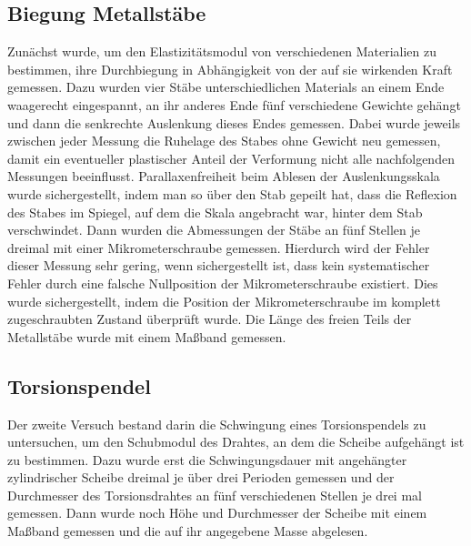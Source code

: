 \documentclass[
	a4paper,
	12pt,
	pagesize,
	ngerman
]{scrartcl}
\begin{document}
	\subsection{Biegung Metallstäbe}
	Zunächst wurde, um den Elastizitätsmodul von verschiedenen Materialien zu bestimmen, ihre Durchbiegung in Abhängigkeit von der auf sie wirkenden Kraft gemessen.
	Dazu wurden vier Stäbe unterschiedlichen Materials an einem Ende waagerecht eingespannt, an ihr anderes Ende fünf verschiedene Gewichte gehängt und dann die senkrechte Auslenkung dieses Endes gemessen.
	Dabei wurde jeweils zwischen jeder Messung die Ruhelage des Stabes ohne Gewicht neu gemessen, damit ein eventueller plastischer Anteil der Verformung nicht alle nachfolgenden Messungen beeinflusst. Parallaxenfreiheit beim Ablesen der Auslenkungsskala wurde sichergestellt, indem man so über den Stab gepeilt hat, dass die Reflexion des Stabes im Spiegel, auf dem die Skala angebracht war, hinter dem Stab verschwindet. 
	Dann wurden die Abmessungen der Stäbe an fünf Stellen je dreimal mit einer Mikrometerschraube  gemessen.
	Hierdurch wird der Fehler dieser Messung sehr gering, wenn sichergestellt ist, dass kein systematischer Fehler durch eine falsche Nullposition der Mikrometerschraube existiert.
	Dies wurde sichergestellt, indem die Position der Mikrometerschraube im komplett zugeschraubten Zustand überprüft wurde.
	Die Länge des freien Teils der Metallstäbe wurde mit einem Maßband gemessen.
	
	\subsection{Torsionspendel}
	Der zweite Versuch bestand darin die Schwingung eines Torsionspendels zu untersuchen, um den Schubmodul des Drahtes, an dem die Scheibe aufgehängt ist zu bestimmen.
	Dazu wurde erst die Schwingungsdauer mit angehängter zylindrischer Scheibe dreimal je über drei Perioden gemessen und der Durchmesser des Torsionsdrahtes an fünf verschiedenen Stellen je drei mal gemessen. Dann wurde noch Höhe und Durchmesser der Scheibe mit einem Maßband gemessen und die auf ihr angegebene Masse abgelesen.
\end{document}
